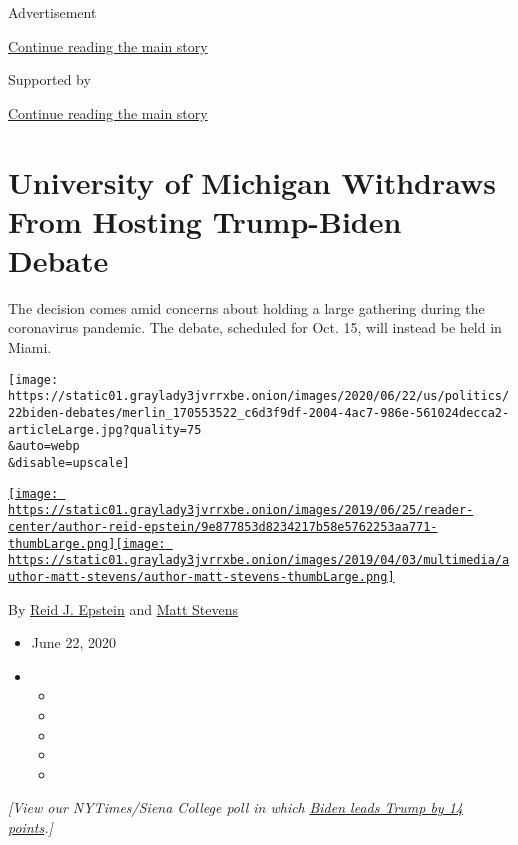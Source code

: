 Advertisement

\protect\hyperlink{after-top}{Continue reading the main story}

Supported by

\protect\hyperlink{after-sponsor}{Continue reading the main story}

\hypertarget{university-of-michigan-withdraws-from-hosting-trump-biden-debate}{%
\section{University of Michigan Withdraws From Hosting Trump-Biden
Debate}\label{university-of-michigan-withdraws-from-hosting-trump-biden-debate}}

The decision comes amid concerns about holding a large gathering during
the coronavirus pandemic. The debate, scheduled for Oct. 15, will
instead be held in Miami.

\texttt{[image: https://static01.graylady3jvrrxbe.onion/images/2020/06/22/us/politics/22biden-debates/merlin\_170553522\_c6d3f9df-2004-4ac7-986e-561024decca2-articleLarge.jpg?quality=75\\\&auto=webp\\\&disable=upscale]}

\href{https://www.nytimes3xbfgragh.onion/by/reid-j-epstein}{\texttt{[image: https://static01.graylady3jvrrxbe.onion/images/2019/06/25/reader-center/author-reid-epstein/9e877853d8234217b58e5762253aa771-thumbLarge.png]}}\href{https://www.nytimes3xbfgragh.onion/by/matt-stevens}{\texttt{[image: https://static01.graylady3jvrrxbe.onion/images/2019/04/03/multimedia/author-matt-stevens/author-matt-stevens-thumbLarge.png]}}

By \href{https://www.nytimes3xbfgragh.onion/by/reid-j-epstein}{Reid J.
Epstein} and
\href{https://www.nytimes3xbfgragh.onion/by/matt-stevens}{Matt Stevens}

\begin{itemize}
\item
  June 22, 2020
\item
  \begin{itemize}
  \item
  \item
  \item
  \item
  \item
  \end{itemize}
\end{itemize}

\emph{{[}View our NYTimes/Siena College poll in which}
\href{https://www.nytimes3xbfgragh.onion/2020/06/24/us/politics/trump-biden-poll-nyt-upshot-siena-college.html}{\emph{Biden
leads Trump by 14 points}}\emph{.{]}}

